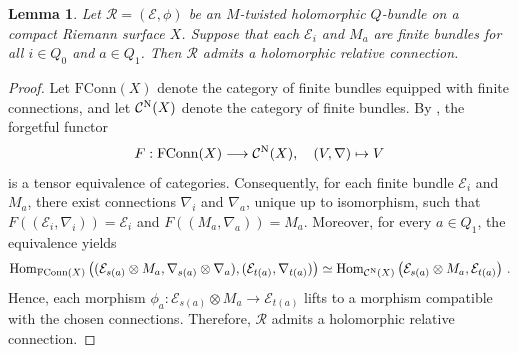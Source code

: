 \documentclass[12pt, reqno]{amsart}
\theoremstyle{plain}
\newtheorem{lemma}[theorem]{Lemma}
\numberwithin{equation}{section}
\newcommand{\E}{\mathcal{E}}
\begin{document}
	
	\begin{lemma}
		Let $\mathcal{R}=(\mathcal{E}, \phi)$ be an $M$-twisted holomorphic $Q$-bundle on a compact Riemann surface $X$. Suppose that each $\mathcal{E}_i$  and $M_a$ are finite bundles for all $i\in Q_0$ and $a\in Q_1$. Then $\mathcal{R}$ admits a holomorphic relative connection.
	\end{lemma}
	\begin{proof}
		Let $\mathrm{FConn}(X)$ denote the category of finite bundles equipped with finite connections, and let $\mathcal{C}^{\rm N}(X)$ denote the category of finite bundles. By \cite[Theorem 2.15]{EH}, the forgetful functor 
		$$F:\mathrm{FConn}(X) \longrightarrow \mathcal{C}^{\rm N}(X), \quad (V, \nabla) \mapsto V$$
		is a tensor equivalence of categories. Consequently, for each finite bundle $\E_i$
		and $M_a$, there exist connections $\nabla_{i}$ and $\nabla_{a}$, unique up to isomorphism, such that $F\left((\mathcal{E}_i, \nabla_i)\right)=\mathcal{E}_i$ and $F((M_a, \nabla_a))=M_a$. Moreover, for every $a\in Q_1$, the equivalence yields
		$$\mathrm{Hom}_{\mathrm{FConn}(X)}\left((\mathcal{E}_{s(a)} \otimes M_a, \nabla_{s(a)}\otimes \nabla_a), (\mathcal{E}_{t(a)}, \nabla_{t(a)})\right) \simeq  \mathrm{Hom}_{\mathcal{C}^{\rm N}(X)}\left(\mathcal{E}_{s(a)} \otimes M_a, \mathcal{E}_{t(a)}\right)\, .$$ Hence, each morphism $\phi_{a}: \E_{s(a)} \otimes M_a \rightarrow \E_{t(a)}$ lifts to a morphism compatible with the chosen connections. Therefore, $\mathcal{R}$ admits a holomorphic relative connection.
	\end{proof}
	
\end{document}
